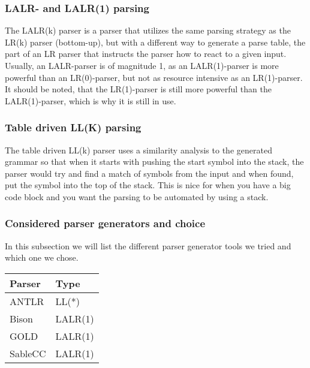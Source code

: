 \subsubsection*{LALR- and LALR(1) parsing}
The LALR(k) parser is a parser that utilizes the same parsing strategy as the LR(k) parser (bottom-up), but with a different way to generate a parse table, the part of an LR parser that instructs the parser how to react to a given input. Usually, an LALR-parser is of magnitude 1, as an LALR(1)-parser is more powerful than an LR(0)-parser, but not as resource intensive as an LR(1)-parser. It should be noted, that the LR(1)-parser is still more powerful than the LALR(1)-parser, which is why it is still in use\cite{crafting-a-compiler}.

\subsubsection*{Table driven LL(K) parsing}
The table driven LL(k) parser uses a similarity analysis to the generated grammar so that when it starts with pushing the start symbol into the stack, the parser would try and find a match of symbols from the input and when found, put the symbol into the top of the stack\cite{crafting-a-compiler}. This is nice for when you have a big code block and you want the parsing to be automated by using a stack.

\subsubsection{Considered parser generators and choice}
In this subsection we will list the different parser generator tools we tried and which one we chose. \\

\begin{table}[h]
\centering
\begin{tabular}{@{}ll@{}}
\toprule
\textbf{Parser} & \textbf{Type} \\ \midrule
ANTLR           & LL(*)         \\
Bison           & LALR(1)       \\
GOLD            & LALR(1)       \\
SableCC         & LALR(1)       \\ \bottomrule
\end{tabular}
\label{parser_table}
\end{table}

